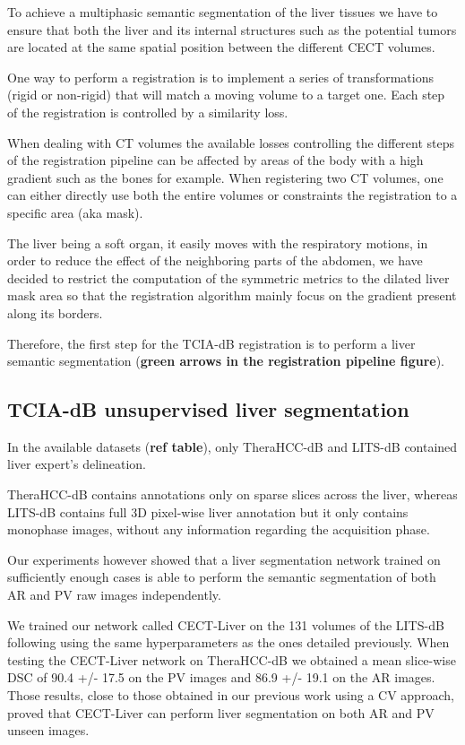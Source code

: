 \documentclass[]{article}
\begin{document}
To achieve a multiphasic semantic segmentation of the liver tissues we
have to ensure that both the liver and its internal structures such as
the potential tumors are located at the same spatial position between
the different CECT volumes.

One way to perform a registration is to implement a series of
transformations (rigid or non-rigid) that will match a moving volume to
a target one. Each step of the registration is controlled by a
similarity loss.

When dealing with CT volumes the available losses controlling the
different steps of the registration pipeline can be affected by areas of
the body with a high gradient such as the bones for example. When
registering two CT volumes, one can either directly use both the entire
volumes or constraints the registration to a specific area (aka mask).

The liver being a soft organ, it easily moves with the respiratory
motions, in order to reduce the effect of the neighboring parts of the
abdomen, we have decided to restrict the computation of the symmetric
metrics to the dilated liver mask area so that the registration
algorithm mainly focus on the gradient present along its borders.

Therefore, the first step for the TCIA-dB registration is to perform a
liver semantic segmentation (\textbf{green arrows in the registration
pipeline figure}).

\subsection{TCIA-dB unsupervised liver
segmentation}\label{tcia-db-unsupervised-liver-segmentation}

In the available datasets (\textbf{ref table}), only TheraHCC-dB and
LITS-dB contained liver expert's delineation.

TheraHCC-dB contains annotations only on sparse slices across the liver,
whereas LITS-dB contains full 3D pixel-wise liver annotation but it only
contains monophase images, without any information regarding the
acquisition phase.

Our experiments however showed that a liver segmentation network trained
on sufficiently enough cases is able to perform the semantic
segmentation of both AR and PV raw images independently.

We trained our network called CECT-Liver on the 131 volumes of the
LITS-dB following using the same hyperparameters as the ones detailed
previously. When testing the CECT-Liver network on TheraHCC-dB we
obtained a mean slice-wise DSC of 90.4 +/- 17.5 on the PV images and
86.9 +/- 19.1 on the AR images. Those results, close to those obtained
in our previous work using a CV approach, proved that CECT-Liver can
perform liver segmentation on both AR and PV unseen images.
\end{document}
